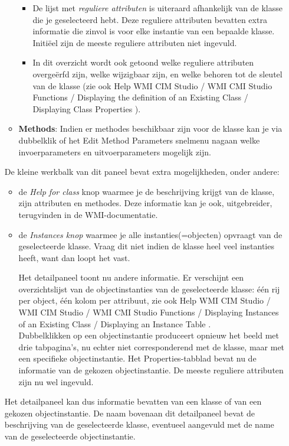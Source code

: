\documentclass[11pt,a4paper]{report}
\begin{document}
\begin{itemize}
\begin{itemize}
\begin{itemize}
			\item De lijst met \textit{reguliere attributen} is uiteraard afhankelijk van de klasse die je geselecteerd hebt. Deze reguliere attributen bevatten extra informatie die zinvol is voor elke instantie van een bepaalde klasse. Initiëel zijn de meeste reguliere attributen niet ingevuld.
			\item In dit overzicht wordt ook getoond welke reguliere attributen overgeërfd zijn, welke wijzigbaar zijn, en welke behoren tot de sleutel van de klasse (zie ook Help WMI CIM Studio / WMI CMI Studio Functions / Displaying the definition of an Existing Class / Displaying Class Properties ).
		\end{itemize}
		\item \textbf{Methods}: Indien er methodes beschikbaar zijn voor de klasse kan je via dubbelklik of het Edit Method Parameters snelmenu nagaan welke invoerparameters en uitvoerparameters mogelijk zijn.
	\end{itemize}
	De kleine werkbalk van dit paneel bevat extra mogelijkheden, onder andere:
	\begin{itemize}
		\item de \textit{Help for class} knop waarmee je de beschrijving krijgt van de klasse, zijn attributen en methodes. Deze informatie kan je ook, uitgebreider, terugvinden in de WMI-documentatie.
		\item de \textit{Instances knop} waarmee je alle instanties(=objecten) opvraagt van de geselecteerde klasse. Vraag dit niet indien de klasse heel veel instanties heeft, want dan loopt het vast.
		\par Het detailpaneel toont nu andere informatie. Er verschijnt een overzichtslijst van de objectinstanties van de geselecteerde klasse: één rij per object, één kolom per attribuut, zie ook Help WMI CIM Studio / WMI CIM Studio / WMI CMI Studio Functions / Displaying Instances of an Existing Class / Displaying an Instance Table . \\
		Dubbelklikken op een objectinstantie produceert opnieuw het beeld met drie tabpagina's, nu echter niet corresponderend met de klasse, maar met een specifieke objectinstantie. Het Properties-tabblad bevat nu de informatie van de gekozen objectinstantie. De meeste reguliere attributen zijn nu wel ingevuld.
	\end{itemize}
	Het detailpaneel kan dus informatie bevatten van een klasse of van een gekozen objectinstantie. De naam bovenaan dit detailpaneel bevat de beschrijving van de geselecteerde klasse, eventueel aangevuld met de name van de geselecteerde objectinstantie.
\end{itemize}
\end{document}
